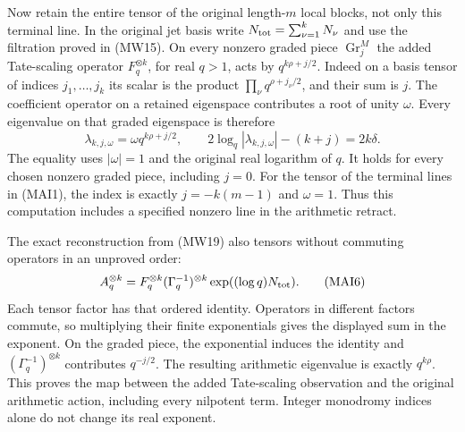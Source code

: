 Now retain the entire tensor of the original length-$m$ local
blocks, not only this terminal line. In the original jet basis
write $N_{\rm tot}=\sum_{\nu=1}^kN_\nu$ and use the filtration
proved in (MW15). On every nonzero graded piece $\operatorname{Gr}_j^M$ the added
Tate-scaling operator $F_q^{\otimes k}$, for real $q>1$, acts by
$q^{k\rho+j/2}$. Indeed on a basis tensor of indices
$j_1,\ldots,j_k$ its scalar is the product
$\prod_\nu q^{\rho+j_\nu/2}$, and their sum is $j$.
The coefficient operator on a retained eigenspace contributes a
root of unity $\omega$. Every eigenvalue on that graded
eigenspace is therefore
\[
 \lambda_{k,j,\omega}=\omega q^{k\rho+j/2},
 \qquad
 2\log_q|\lambda_{k,j,\omega}|-(k+j)=2k\delta.
 \tag{MAI5}
\]
The equality uses $|\omega|=1$ and the original real logarithm
of $q$. It holds for every chosen nonzero graded piece, including $j=0$.
For the tensor of the terminal lines in (MAI1), the index is
exactly $j=-k(m-1)$ and $\omega=1$. Thus this computation
includes a specified nonzero line in the arithmetic retract.

The exact reconstruction from (MW19) also tensors without
commuting operators in an unproved order:
\[
 A_q^{\otimes k}
 =F_q^{\otimes k}(\Gamma_q^{-1})^{\otimes k}
                 \exp((\log q)N_{\rm tot}).
 \tag{MAI6}
\]
Each tensor factor has that ordered identity. Operators in
different factors commute, so multiplying their finite
exponentials gives the displayed sum in the exponent. On the
graded piece, the exponential induces the identity and
$(\Gamma_q^{-1})^{\otimes k}$ contributes $q^{-j/2}$.
The resulting arithmetic eigenvalue is exactly $q^{k\rho}$.
This proves the map between the added Tate-scaling observation
and the original arithmetic action, including every nilpotent
term. Integer monodromy indices alone do not change its real
exponent.

